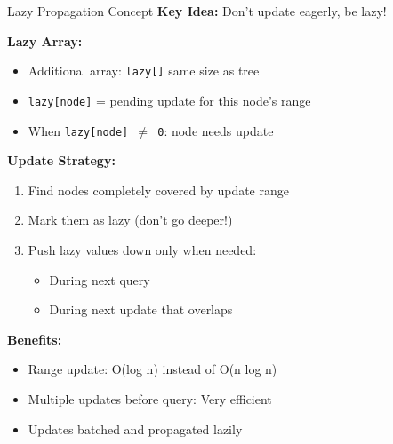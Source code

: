 \documentclass[aspectratio=169]{beamer}
\begin{document}
\begin{frame}{Lazy Propagation Concept}
  \textbf{Key Idea:} Don't update eagerly, be lazy!

  \vspace{0.5cm}
  \textbf{Lazy Array:}
  \begin{itemize}
    \item Additional array: \texttt{lazy[]} same size as tree
    \item \texttt{lazy[node]} = pending update for this node's range
    \item When \texttt{lazy[node] $\neq$ 0}: node needs update
  \end{itemize}

  \vspace{0.5cm}
  \textbf{Update Strategy:}
  \begin{enumerate}
    \item Find nodes completely covered by update range
    \item Mark them as lazy (don't go deeper!)
    \item Push lazy values down only when needed:
      \begin{itemize}
        \item During next query
        \item During next update that overlaps
      \end{itemize}
  \end{enumerate}

  \vspace{0.5cm}
  \textbf{Benefits:}
  \begin{itemize}
    \item Range update: O(log n) instead of O(n log n)
    \item Multiple updates before query: Very efficient
    \item Updates batched and propagated lazily
  \end{itemize}
\end{frame}
\end{document}
